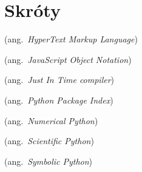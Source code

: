 \chapter*{Skróty}\mbox{}
\label{sec:skroty}
\noindent
\begin{description}
  \item [HTML]    (ang.\ \emph{HyperText Markup Language})
  \item [JSON]    (ang.\ \emph{JavaScript Object Notation})
  \item [JIT]     (ang.\ \emph{Just In Time compiler})
  \item [PyPI]    (ang.\ \emph{Python Package Index})
  \item [NumPy] (ang.\ \emph{Numerical Python})
  \item [SciPy] (ang.\ \emph{Scientific Python})
  \item [SymPy] (ang.\ \emph{Symbolic Python})
  \item 
\end{description}
